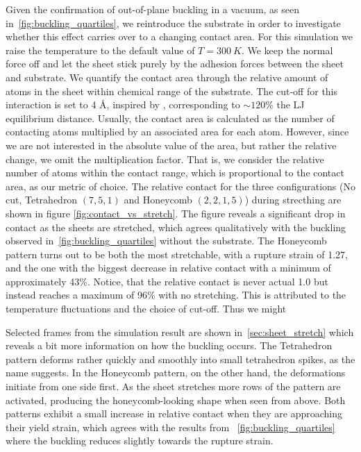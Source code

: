 Given the confirmation of out-of-plane buckling in a vacuum, as seen in~\cref{fig:buckling_quartiles}, we reintroduce the substrate in order to
investigate whether this effect carries over to a changing contact area. For this simulation we raise the temperature to the default value of $T =\SI{300}{K}$. We keep the normal force off and let the sheet stick purely by the adhesion forces between the sheet and substrate. We quantify the contact area through the relative
amount of atoms in the sheet within chemical range of the substrate. The cut-off
for this interaction is set to 4 Å, inspired by \cite{li_evolving_2016},
corresponding to $\sim 120\%$ the \acrshort{LJ} equilibrium distance. Usually, the contact area is calculated as the number of contacting atoms multiplied by an
associated area for each atom. However, since we are not interested in the
absolute value of the area, but rather the relative change, we omit the
multiplication factor. That is, we consider the relative number of atoms within
the contact range, which is proportional to the contact area, as our metric of
choice. The relative contact for the three configurations (No cut, Tetrahedron
$(7,5,1)$ and Honeycomb $(2,2,1,5)$) during strecthing are shown in figure
\cref{fig:contact_vs_stretch}. The figure reveals a significant drop in contact
as the sheets are stretched, which agrees qualitatively with the buckling
observed in~\cref{fig:buckling_quartiles} without the substrate. The Honeycomb
pattern turns out to be both the most stretchable, with a rupture strain of 1.27, and the one with the biggest decrease in relative contact with a minimum of approximately 43\%. Notice, that the relative contact is never
actual 1.0 but instead reaches a maximum of 96\% with no stretching. This is
attributed to the temperature fluctuations and the choice of cut-off. Thus we might 

Selected frames from the simulation result are shown in~\cref{sec:sheet_stretch}
which reveals a bit more information on how the buckling occurs. The Tetrahedron pattern deforms rather quickly and smoothly into small tetrahedron
spikes, as the name suggests. In the Honeycomb pattern, on the other hand, the
deformations initiate from one side first. As the sheet stretches more rows of
the pattern are activated, producing the honeycomb-looking shape when seen from
above. Both patterns exhibit a small increase in relative contact when they
are approaching their yield strain, which agrees with the results from ~\cref{fig:buckling_quartiles} where the buckling reduces slightly towards the
rupture strain.


